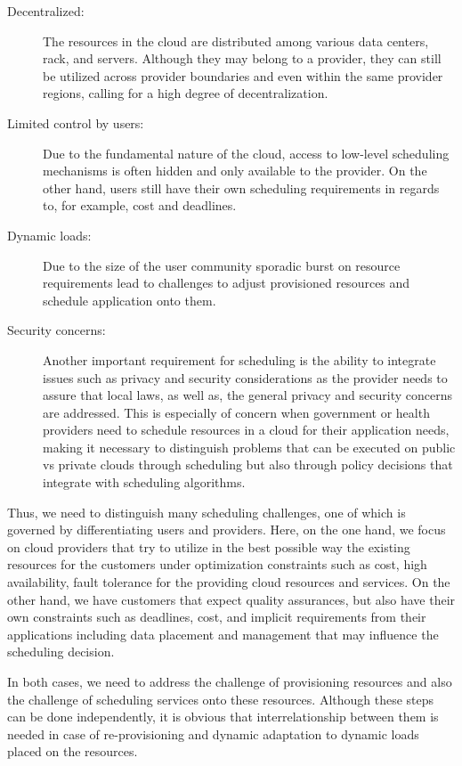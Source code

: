 \documentclass[final,5p,times,twocolumn]{elsarticle}
\begin{document}
\begin{description}
\item [Decentralized:] The resources in the cloud are distributed among various data centers, rack, and servers. Although they may belong to a provider, they can still be utilized across provider boundaries and even within the same provider regions, calling for a high degree of decentralization.

\item[Limited control by users:] Due to the fundamental nature of the cloud, access to low-level scheduling mechanisms is often hidden and only available to the provider. On the other hand, users still have their own scheduling requirements in regards to, for example, cost and deadlines.
 
\item[Dynamic loads:] Due to the size of the user community sporadic burst on resource requirements lead to challenges to adjust provisioned resources and schedule application onto them.

\item[Security concerns:] Another important requirement for scheduling is the ability to integrate issues such as privacy and security considerations as the provider needs to assure that local laws, as well as, the general privacy and security concerns are addressed. This is especially of concern when government or health providers need to schedule resources in a cloud for their application needs, making it necessary to distinguish problems that can be executed on public vs private clouds through scheduling but also through policy decisions that integrate with scheduling algorithms.
 
\end{description}

Thus, we need to distinguish many scheduling challenges, one of which is governed by differentiating users and providers. Here, on the one hand, we focus on cloud providers that try to utilize in the best possible way the existing resources for the customers under optimization constraints such as cost, high availability, fault tolerance for the providing cloud resources and services. On the other hand, we have customers that expect quality assurances, but also have their own constraints such as deadlines, cost, and implicit requirements from their applications including data placement and management that may influence the scheduling decision.

In both cases, we need to address the challenge of provisioning resources and also the challenge of scheduling services onto these resources. Although these steps can be done independently, it is obvious that interrelationship between them is needed in case of re-provisioning and dynamic adaptation to dynamic loads placed on the resources.
\end{document}
